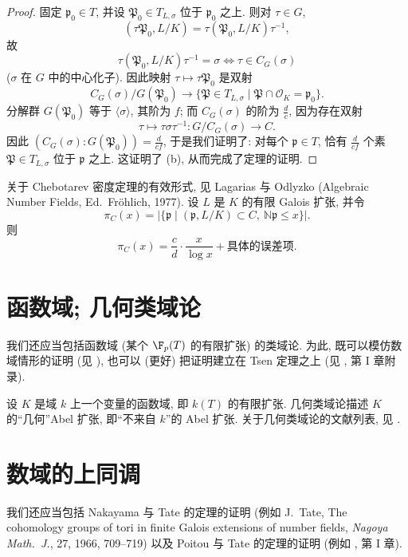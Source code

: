 \begin{proof}
固定 $\mathfrak{p}_0\in T$, 并设 $\mathfrak{P}_0\in T_{L,\sigma}$ 位于 $\mathfrak{p}_0$ 之上. 则对 $\tau\in G$,
\[
(\tau\mathfrak{P}_{0},L/K)=\tau(\mathfrak{P}_{0},L/K)\tau^{-1},
\]
故
\[
\tau(\mathfrak{P}_{0},L/K)\tau^{-1}=\sigma\iff\tau\in C_{G}(\sigma)
\]
($\sigma$ 在 $G$ 中的中心化子). 因此映射 $\tau\mapsto\tau\mathfrak{P}_0$ 是双射
\[
C_{G}(\sigma)/G(\mathfrak{P}_{0})\to\{\mathfrak{P}\in T_{L,\sigma}\mid\mathfrak{P}\cap\mathcal{O}_{K}=\mathfrak{p}_{0}\}.
\]
分解群 $G(\mathfrak{P}_0)$ 等于 $\langle\sigma\rangle$, 其阶为 $f$; 而 $C_G(\sigma)$ 的阶为 $\frac{d}{c}$, 因为存在双射
\[
\tau\mapsto\tau\sigma\tau^{-1}:G/C_{G}(\sigma)\to C.
\]
因此 $(C_G(\sigma):G(\mathfrak{P}_0))=\frac{d}{cf}$, 于是我们证明了: 对每个 $\mathfrak{p}\in T$, 恰有 $\frac{d}{cf}$ 个素 $\mathfrak{P}\in T_{L,\sigma}$ 位于 $\mathfrak{p}$ 之上. 这证明了 (b), 从而完成了定理的证明.
\end{proof}

\begin{remark}\label{rem:viii.7.5}
关于 Chebotarev 密度定理的有效形式, 见 Lagarias 与 Odlyzko (Algebraic Number Fields, Ed.~Fr\"ohlich, 1977). 设 $L$ 是 $K$ 的有限 Galois 扩张, 并令
\[
\pi_{C}(x)=|\{\mathfrak{p}\mid(\mathfrak{p},L/K)\subset C,\ \mathbb{N}\mathfrak{p}\le x\}|.
\]
则
\[
\pi_{C}(x)=\frac{c}{d}\cdot\frac{x}{\log x}+\text{具体的误差项}.
\]
\end{remark}

\section{函数域; 几何类域论}\label{sec:VIII.8}

我们还应当包括函数域 (某个 $\F_p(T)$ 的有限扩张) 的类域论. 为此, 既可以模仿数域情形的证明 (见 \cite{ArtinTate1961}), 也可以 (更好) 把证明建立在 Tsen 定理之上 (见 \cite{Milne2006}, 第 I 章附录).

设 $K$ 是域 $k$ 上一个变量的函数域, 即 $k(T)$ 的有限扩张. 几何类域论描述 $K$ 的``几何''Abel 扩张, 即``不来自 $k$''的 Abel 扩张. 关于几何类域论的文献列表, 见 .

\section{数域的上同调}\label{sec:VIII.9}

我们还应当包括 Nakayama 与 Tate 的定理的证明 (例如 J.~Tate, The cohomology groups of tori in finite Galois extensions of number fields, \emph{Nagoya Math.~J.}, 27, 1966, 709--719) 以及 Poitou 与 Tate 的定理的证明 (例如 \cite{Milne2006}, 第 I 章).

